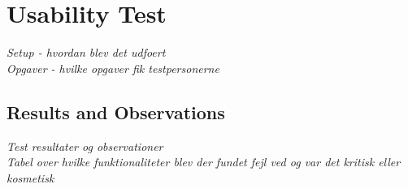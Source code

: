 \section{Usability Test}
\textit{Setup - hvordan blev det udfoert\\
Opgaver - hvilke opgaver fik testpersonerne}

\subsection{Results and Observations}
\label{sec:usability_results}
\textit{Test resultater og observationer\\
Tabel over hvilke funktionaliteter blev der fundet fejl ved og var det kritisk eller kosmetisk}